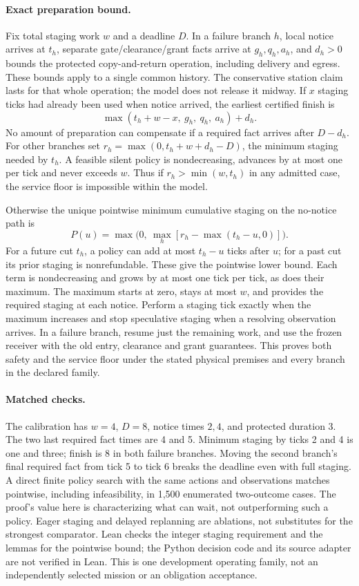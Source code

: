 \documentclass[11pt]{article}
\begin{document}
\paragraph{Exact preparation bound.}
Fix total staging work $w$ and a deadline $D$. In a failure branch
$h$, local notice arrives at $t_h$, separate gate/clearance/grant
facts arrive at $g_h,q_h,a_h$, and $d_h>0$ bounds the protected
copy-and-return operation, including delivery and egress.
These bounds apply to a single common history. The conservative
station claim lasts for that whole operation; the model does not
release it midway. If $x$ staging ticks had already been used
when notice arrived, the earliest certified finish is
\[
 \max(t_h+w-x,\ g_h,\ q_h,\ a_h)+d_h.
\]
No amount of preparation can compensate if a required fact arrives
after $D-d_h$. For other branches set
$r_h=\max(0,t_h+w+d_h-D)$, the minimum staging needed by $t_h$.
A feasible silent policy is nondecreasing, advances by at most one
per tick and never exceeds $w$. Thus if $r_h>\min(w,t_h)$
in any admitted case, the service floor is impossible within the model.

Otherwise the unique pointwise minimum cumulative staging on the
no-notice path is
\[
 P(u)=\max\bigl(0,\ \max_h[r_h-\max(t_h-u,0)]\bigr).
\]
For a future cut $t_h$, a policy can add at most $t_h-u$ ticks
after $u$; for a past cut its prior staging is nonrefundable. These
give the pointwise lower bound. Each term is nondecreasing and
grows by at most one tick per tick, as does their maximum.
The maximum starts at zero, stays at most $w$, and provides the
required staging at each notice. Perform a staging tick exactly
when the maximum increases and stop speculative staging when a
resolving observation arrives. In a failure branch, resume just
the remaining work, and use the frozen receiver with the old entry,
clearance and grant guarantees. This proves both safety and
the service floor under the stated physical premises and every
branch in the declared family.

\paragraph{Matched checks.}
The calibration has $w=4$, $D=8$, notice times $2,4$, and protected
duration 3. The two last required fact times are 4 and 5. Minimum
staging by ticks 2 and 4 is one and three; finish is 8 in both
failure branches. Moving the second branch's final required fact from tick 5 to
tick 6 breaks the deadline even with full staging. A
direct finite policy search with the same actions and observations
matches pointwise, including infeasibility, in 1,500 enumerated
two-outcome cases. The proof's value here is characterizing what
can wait, not outperforming such a policy. Eager staging and delayed
replanning are ablations, not substitutes for the strongest comparator.
Lean checks the integer staging requirement and the lemmas for the
pointwise bound; the Python decision code and its source adapter are
not verified in Lean. This is one development operating family,
not an independently selected mission or an obligation acceptance.
\end{document}
